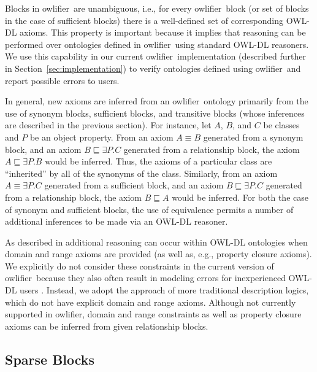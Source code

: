 \documentclass[5p,authoryear]{elsarticle}
\newcommand{\owlifier}{\textsf{owlifier}}
\newcommand{\secref}[1]{Section~\ref{#1}}
\begin{document}
Blocks in \owlifier\ are unambiguous, i.e., for every \owlifier\ block
(or set of blocks in the case of sufficient blocks) there is a
well-defined set of corresponding OWL-DL axioms. This property is
important because it implies that reasoning can be performed over
ontologies defined in \owlifier\ using standard OWL-DL reasoners.  We
use this capability in our current \owlifier\ implementation
(described further in \secref{sec:implementation}) to verify
ontologies defined using \owlifier\ and report possible errors to
users.

In general, new axioms are inferred from an \owlifier\ ontology
primarily from the use of synonym blocks, sufficient blocks, and
transitive blocks (whose inferences are described in the previous
section). For instance, let $A$, $B$, and $C$ be classes and $P$ be an
object property. From an axiom $A \equiv B$ generated from a synonym
block, and an axiom $B \sqsubseteq \exists P.C$ generated from a
relationship block, the axiom $A \sqsubseteq \exists P.B$ would be
inferred. Thus, the axioms of a particular class are ``inherited'' by
all of the synonyms of the class. Similarly, from an axiom $A \equiv
\exists P. C$ generated from a sufficient block, and an axiom $B
\sqsubseteq \exists P.C$ generated from a relationship block, the axiom
$B \sqsubseteq A$ would be inferred. For both the case of synonym and
sufficient blocks, the use of equivalence permits a number of
additional inferences to be made via an OWL-DL reasoner.

As described in \citep{rector04:_owl_pizzas} additional reasoning can
occur within OWL-DL ontologies when domain and range axioms are
provided (as well as, e.g., property closure axioms).  We explicitly
do not consider these constraints in the current version of \owlifier\
because they also often result in modeling errors for inexperienced
OWL-DL users \citep{rector04:_owl_pizzas}. Instead, we adopt the
approach of more traditional description logics, which do not have
explicit domain and range axioms.  Although not currently supported in
\owlifier, domain and range constraints as well as property closure
axioms can be inferred from given relationship blocks.

\subsection{Sparse Blocks} 
\end{document}
